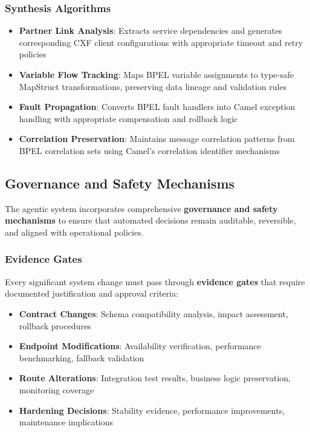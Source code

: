 \documentclass[11pt,a4paper]{article}
\begin{document}
\subsubsection{Synthesis Algorithms}
\begin{itemize}
\item \textbf{Partner Link Analysis}: Extracts service dependencies and generates corresponding CXF client configurations with appropriate timeout and retry policies
\item \textbf{Variable Flow Tracking}: Maps BPEL variable assignments to type-safe MapStruct transformations, preserving data lineage and validation rules
\item \textbf{Fault Propagation}: Converts BPEL fault handlers into Camel exception handling with appropriate compensation and rollback logic
\item \textbf{Correlation Preservation}: Maintains message correlation patterns from BPEL correlation sets using Camel's correlation identifier mechanisms
\end{itemize}

\subsection{Governance and Safety Mechanisms}
The agentic system incorporates comprehensive \textbf{governance and safety mechanisms} to ensure that automated decisions remain auditable, reversible, and aligned with operational policies.

\subsubsection{Evidence Gates}
Every significant system change must pass through \textbf{evidence gates} that require documented justification and approval criteria:
\begin{itemize}
\item \textbf{Contract Changes}: Schema compatibility analysis, impact assessment, rollback procedures
\item \textbf{Endpoint Modifications}: Availability verification, performance benchmarking, fallback validation
\item \textbf{Route Alterations}: Integration test results, business logic preservation, monitoring coverage
\item \textbf{Hardening Decisions}: Stability evidence, performance improvements, maintenance implications
\end{itemize}
\end{document}
